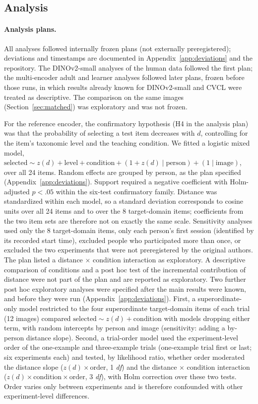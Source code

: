 \documentclass[11pt]{article}
\begin{document}
\subsection{Analysis}

\paragraph{Analysis plans.} All analyses followed internally frozen plans (not externally preregistered); deviations and timestamps are documented in Appendix~\ref{app:deviations} and the repository. The DINOv2-small analyses of the human data followed the first plan; the multi-encoder adult and learner analyses followed later plans, frozen before those runs, in which results already known for DINOv2-small and CVCL were treated as descriptive. The comparison on the same images (Section~\ref{sec:matched}) was exploratory and was not frozen.

For the reference encoder, the confirmatory hypothesis (H4 in the analysis plan) was that the probability of selecting a test item decreases with $d$, controlling for the item's taxonomic level and the teaching condition. We fitted a logistic mixed model, $\mathrm{selected} \sim z(d) + \mathrm{level} + \mathrm{condition} + (1 + z(d) \mid \mathrm{person}) + (1 \mid \mathrm{image})$, over all 24 items. Random effects are grouped by person, as the plan specified (Appendix~\ref{app:deviations}). Support required a negative coefficient with Holm-adjusted $p < .05$ within the six-test confirmatory family. Distance was standardized within each model, so a standard deviation corresponds to \SDdAll{} cosine units over all 24 items and to \SDdTarget{} over the 8 target-domain items; coefficients from the two item sets are therefore not on exactly the same scale. Sensitivity analyses used only the 8 target-domain items, only each person's first session (identified by its recorded start time), excluded people who participated more than once, or excluded the two experiments that were not preregistered by the original authors. The plan listed a distance $\times$ condition interaction as exploratory. A descriptive comparison of conditions and a post hoc test of the incremental contribution of distance were not part of the plan and are reported as exploratory. Two further post hoc exploratory analyses were specified after the main results were known, and before they were run (Appendix~\ref{app:deviations}). First, a superordinate-only model restricted to the four superordinate target-domain items of each trial (12 images) compared $\mathrm{selected} \sim z(d) + \mathrm{condition}$ with models dropping either term, with random intercepts by person and image (sensitivity: adding a by-person distance slope). Second, a trial-order model used the experiment-level order of the one-example and three-example trials (one-example trial first or last; six experiments each) and tested, by likelihood ratio, whether order moderated the distance slope ($z(d) \times \mathrm{order}$, 1 \textit{df}) and the distance $\times$ condition interaction ($z(d) \times \mathrm{condition} \times \mathrm{order}$, 3 \textit{df}), with Holm correction over these two tests. Order varies only between experiments and is therefore confounded with other experiment-level differences.
\end{document}
